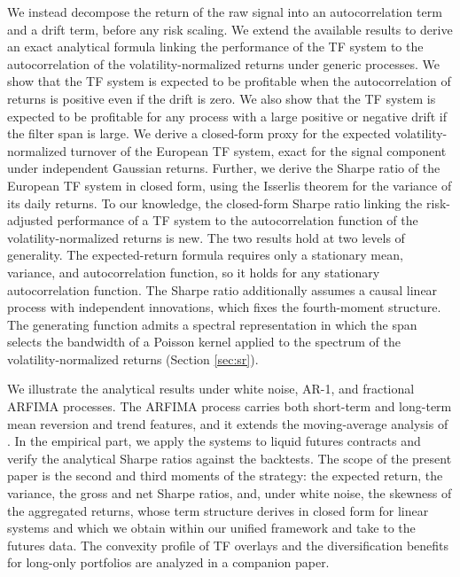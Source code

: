 \documentclass[hidelinks]{siamonline250211}
\begin{document}
We instead decompose the return of the raw signal into an autocorrelation term and a drift term, before any risk scaling. We extend the available results to derive an exact analytical formula linking the performance of the TF system to the autocorrelation of the volatility-normalized returns under generic processes. We show that the TF system is expected to be profitable when the autocorrelation of returns is positive even if the drift is zero. We also show that the TF system is expected to be profitable for any process with a large positive or negative drift if the filter span is large. We derive a closed-form proxy for the expected volatility-normalized turnover of the European TF system, exact for the signal component under independent Gaussian returns. Further, we derive the Sharpe ratio of the European TF system in closed form, using the Isserlis theorem for the variance of its daily returns. To our knowledge, the closed-form Sharpe ratio linking the risk-adjusted performance of a TF system to the autocorrelation function of the volatility-normalized returns is new. The two results hold at two levels of generality. The expected-return formula requires only a stationary mean, variance, and autocorrelation function, so it holds for any stationary autocorrelation function. The Sharpe ratio additionally assumes a causal linear process with independent innovations, which fixes the fourth-moment structure. The generating function admits a spectral representation in which the span selects the bandwidth of a Poisson kernel applied to the spectrum of the volatility-normalized returns (Section \ref{sec:sr}).



We illustrate the analytical results under white noise, AR-1, and fractional ARFIMA processes. The ARFIMA process carries both short-term and long-term mean reversion and trend features, and it extends the moving-average analysis of \cite{Brock1992}. In the empirical part, we apply the systems to liquid futures contracts and verify the analytical Sharpe ratios against the backtests. The scope of the present paper is the second and third moments of the strategy: the expected return, the variance, the gross and net Sharpe ratios, and, under white noise, the skewness of the aggregated returns, whose term structure \cite{Martin2023} derives in closed form for linear systems and which we obtain within our unified framework and take to the futures data. The convexity profile of TF overlays and the diversification benefits for long-only portfolios are analyzed in a companion paper.
\end{document}
